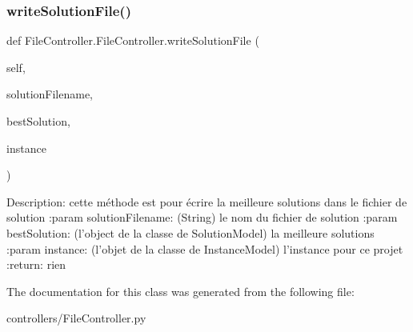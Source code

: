 \subsubsection{\texorpdfstring{write\+Solution\+File()}{writeSolutionFile()}}
{\footnotesize\ttfamily def File\+Controller.\+File\+Controller.\+write\+Solution\+File (\begin{DoxyParamCaption}\item[{}]{self,  }\item[{}]{solution\+Filename,  }\item[{}]{best\+Solution,  }\item[{}]{instance }\end{DoxyParamCaption})}

\begin{DoxyVerb}Description: cette méthode est pour écrire la meilleure solutions dans le fichier de solution
:param solutionFilename: (String) le nom du fichier de solution
:param bestSolution: (l'object de la classe de SolutionModel) la meilleure solutions
:param instance: (l'objet de la classe de InstanceModel) l'instance pour ce projet
:return: rien
\end{DoxyVerb}
 

The documentation for this class was generated from the following file\+:\begin{DoxyCompactItemize}
\item 
controllers/File\+Controller.\+py\end{DoxyCompactItemize}

